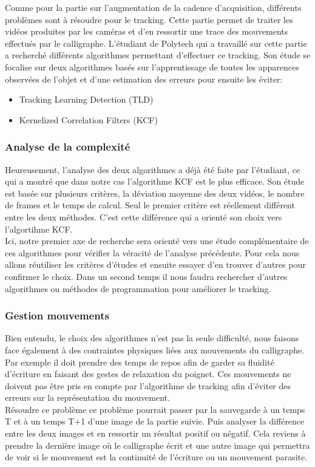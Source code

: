Comme pour la partie sur l'augmentation de la cadence d'acquisition, différents problèmes sont à résoudre pour le tracking. Cette partie permet de traiter les vidéos produites par les caméras et d'en ressortir une trace des mouvements effectués par le calligraphe. L'étudiant de Polytech qui a travaillé sur cette partie a recherché différents algorithmes permettant d'effectuer ce tracking. Son étude se focalise sur deux algorithmes basés sur l'apprentissage de toutes les apparences observées de l'objet et d'une estimation des erreurs pour ensuite les éviter:

\begin{itemize}

\item Tracking Learning Detection (TLD)

\item Kernelized Correlation Filters (KCF)

\end{itemize}

  
\subsubsection{Analyse de la complexité}

Heureusement, l'analyse des deux algorithmes a déjà été faite par l'étudiant, ce qui a montré que dans notre cas l'algorithme KCF est le plus efficace. Son étude est basée sur plusieurs critères, la déviation moyenne des deux vidéos, le nombre de frames et le temps de calcul. Seul le premier critère est réellement différent entre les deux méthodes. C'est cette différence qui a orienté son choix vers l'algortihme KCF. \\

Ici, notre premier axe de recherche sera orienté vers une étude complémentaire de ces algorithmes pour vérifier la véracité de l'analyse précédente. Pour cela nous allons réutiliser les critères d'études et ensuite essayer d'en trouver d'autres pour confirmer le choix. Dans un second temps il nous faudra rechercher d'autres algorithmes ou méthodes de programmation pour améliorer le tracking.

\subsubsection{Gestion mouvements}

Bien entendu, le choix des algorithmes n'est pas la seule difficulté, nous faisons face également à des contraintes physiques liées aux mouvements du calligraphe. Par exemple il doit prendre des temps de repos afin de garder sa fluidité d'écriture en faisant des gestes de relaxation du poignet. Ces mouvements ne doivent pas être pris en compte par l'algorithme de tracking afin d'éviter des erreurs sur la représentation du mouvement. \\

Résoudre ce problème ce problème pourrait passer par la sauvegarde à un temps T et à un temps T+1 d'une image de la partie suivie. Puis analyser la différence entre les deux images et en ressortir un résultat positif ou négatif. Cela reviens à prendre la dernière image où le calligraphe écrit et une autre image qui permettra de voir si le mouvement est la continuité de l'écriture ou un mouvement parasite.